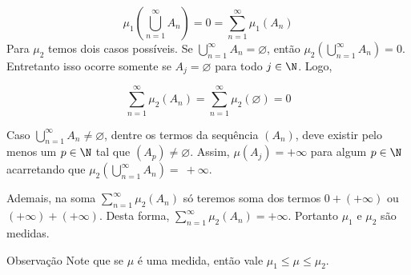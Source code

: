 $$\mu_1\left(\bigcup_{n = 1}^\infty A_n\right) = 0 = \sum_{n = 1}^\infty \mu_1(A_n) $$
Para $\mu_2$ temos dois casos possíveis.
Se  $\displaystyle \bigcup_{n = 1}^\infty A_n  = \varnothing$, então $\mu_2\left(\displaystyle \bigcup_{n = 1}^\infty A_n\right) = 0$. Entretanto isso ocorre somente se $A_j = \varnothing$ para todo $j \in \N$.
Logo, 

$$\sum_{n = 1}^\infty \mu_2(A_n) = \sum_{n = 1}^\infty \mu_2(\varnothing) = 0$$

Caso $\displaystyle \bigcup_{n = 1}^\infty A_n  \neq  \varnothing$, dentre os termos da sequência $(A_n)$, deve existir pelo menos um $p \in \N$ tal que $(A_p) \neq \varnothing$.
Assim, $\mu(A_j) = +\infty$ para algum $p \in \N$ acarretando que  $\mu_2\left(\displaystyle \bigcup_{n = 1}^\infty A_n\right) =~+\infty$.

Ademais, na soma $\displaystyle \sum_{n = 1}^\infty \mu_2(A_n)$ só teremos soma dos termos $0 + (+ \infty)$ ou $(+\infty) + (+\infty)$.
Desta forma, $\displaystyle \sum_{n = 1}^\infty \mu_2(A_n) = +\infty$.
Portanto $\mu_1$ e $\mu_2$ são medidas.

\begin{env}{Observação}
	Note que se $\mu$ é uma medida, então vale $\mu_1\leq \mu \leq \mu_2$.
\end{env}


